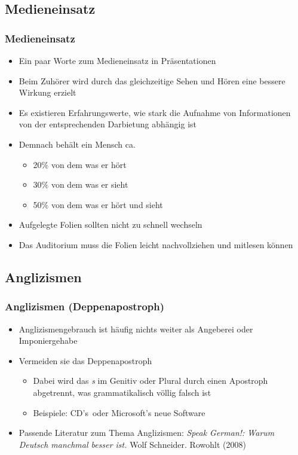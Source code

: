 \documentclass{beamer}
\begin{document}
\subsection{Medieneinsatz}
\begin{frame}
\frametitle{Medieneinsatz}
\begin{itemize}
\item Ein paar Worte zum Medieneinsatz in Präsentationen
\item Beim Zuhörer wird durch das gleichzeitige Sehen und Hören eine bessere Wirkung erzielt
\item Es existieren Erfahrungswerte, wie stark die Aufnahme von Informationen von der entsprechenden Darbietung abhängig ist
\item Demnach behält ein Mensch ca.
\begin{itemize}
\item 20\% von dem was er hört
\item 30\% von dem was er sieht
\item 50\% von dem was er hört und sieht
\end{itemize}
\item Aufgelegte Folien sollten nicht zu schnell wechseln
\item Das Auditorium muss die Folien leicht nachvollziehen und mitlesen können
\end{itemize}
\end{frame}

\subsection{Anglizismen}
\begin{frame}
\frametitle{Anglizismen (Deppenapostroph)}
\begin{itemize}
\item Anglizismengebrauch ist häufig nichts weiter als Angeberei oder Imponiergehabe
\item Vermeiden sie das Deppenapostroph
\begin{itemize}
\item Dabei wird das \emph{s} im Genitiv oder Plural durch einen Apostroph abgetrennt, was  grammatikalisch völlig falsch ist
\item Beispiele: \glqq CD's\grqq\ oder \glqq Microsoft's neue Software\grqq
\end{itemize}
\item Passende Literatur zum Thema Anglizismen: \emph{Speak German!: Warum Deutsch manchmal besser ist.} Wolf Schneider. Rowohlt (2008)
\end{itemize}
\end{frame}
\end{document}
